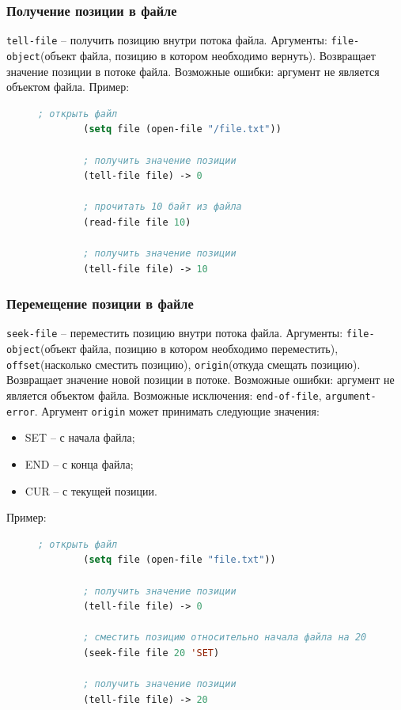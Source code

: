 \subsubsection{Получение позиции в файле}

\texttt{tell-file} -- получить позицию внутри потока файла. Аргументы: \texttt{file-object}(объект файла, позицию в котором необходимо вернуть). Возвращает значение позиции в потоке файла. Возможные ошибки: аргумент не является объектом файла. Пример:
\begin{figure}[H]
	\begin{lstlisting}[language=Lisp]
		; открыть файл
		(setq file (open-file "/file.txt"))
		
		; получить значение позиции
		(tell-file file) -> 0
		
		; прочитать 10 байт из файла
		(read-file file 10)
		
		; получить значение позиции
		(tell-file file) -> 10
	\end{lstlisting}
\end{figure}

\subsubsection{Перемещение позиции в файле}

\texttt{seek-file} -- переместить позицию внутри потока файла. Аргументы: \texttt{file-object}(объект файла, позицию в котором необходимо переместить), \texttt{offset}(насколько сместить позицию), \texttt{origin}(откуда смещать позицию). Возвращает значение новой позиции в потоке. Возможные ошибки: аргумент не является объектом файла. Возможные исключения: \texttt{end-of-file}, \texttt{argument-error}. Аргумент \texttt{origin} может принимать следующие значения:
\begin{itemize}
	\item SET -- с начала файла;
	\item END -- с конца файла;
	\item CUR -- с текущей позиции.
\end{itemize}
Пример:
\begin{figure}[H]
	\begin{lstlisting}[language=Lisp]
		; открыть файл
		(setq file (open-file "file.txt"))
		
		; получить значение позиции
		(tell-file file) -> 0
		
		; сместить позицию относительно начала файла на 20
		(seek-file file 20 'SET)
		
		; получить значение позиции
		(tell-file file) -> 20
	\end{lstlisting}
\end{figure}

